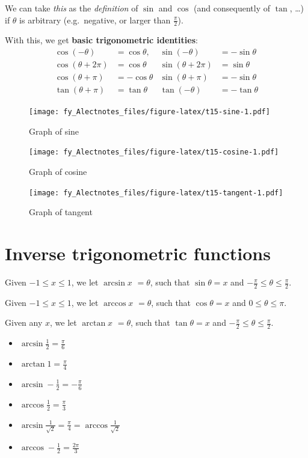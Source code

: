 \documentclass[
  12pt,
  oneside]{book}
\providecommand{\tightlist}{%
  \setlength{\itemsep}{0pt}\setlength{\parskip}{0pt}}
\theoremstyle{definition}
\theoremstyle{definition}
\theoremstyle{definition}
\theoremstyle{definition}
\theoremstyle{remark}
\begin{document}
We can take \emph{this} as the \emph{definition} of \(\sin\) and \(\cos\) (and consequently of \(\tan\), \ldots) if \(\theta\) is arbitrary (e.g.~negative, or larger than \(\frac\pi2\)).

With this, we get \textbf{basic trigonometric identities}:
\begin{align*}
    \cos(-\theta) &=\cos\theta, & \sin(-\theta) &=-\sin\theta \\
    \cos(\theta+2\pi) &=\cos\theta & \sin(\theta+2\pi) &=\sin\theta\\
    \cos(\theta+\pi) &= -\cos\theta & \sin(\theta+\pi) &= -\sin\theta\\
    \tan(\theta+\pi) &= \tan\theta & \tan(-\theta) &= -\tan\theta
\end{align*}

\begin{figure}
\centering
\texttt{[image: fy\_Alectnotes\_files/figure-latex/t15-sine-1.pdf]}
\caption{\label{fig:t15-sine}Graph of sine}
\end{figure}

\begin{figure}
\centering
\texttt{[image: fy\_Alectnotes\_files/figure-latex/t15-cosine-1.pdf]}
\caption{\label{fig:t15-cosine}Graph of cosine}
\end{figure}

\begin{figure}
\centering
\texttt{[image: fy\_Alectnotes\_files/figure-latex/t15-tangent-1.pdf]}
\caption{\label{fig:t15-tangent}Graph of tangent}
\end{figure}

\section{Inverse trigonometric functions}\label{inverse-trigonometric-functions}

Given \(-1\leq x\leq 1\), we let \(\arcsin x\) \(= \theta\), such that \(\sin\theta = x\) and \(-\frac\pi2\leq\theta\leq \frac\pi2\).

Given \(-1\leq x\leq 1\), we let \(\arccos x\) \(= \theta\), such that \(\cos\theta = x\) and \(0\leq\theta\leq \pi\).

Given any \(x\), we let \(\arctan x\) \(= \theta\), such that \(\tan\theta=x\) and \(-\frac\pi2\leq\theta\leq\frac\pi2\).

\begin{itemize}
\tightlist
\item
  \(\arcsin\frac12=\frac{\pi}6\)
\item
  \(\arctan 1 = \frac{\pi}{4}\)
\item
  \(\arcsin -\frac12=-\frac{\pi}6\)
\item
  \(\arccos\frac12 = \frac{\pi}3\)
\item
  \(\arcsin\frac{1}{\sqrt{2}} = \frac{\pi}{4} = \arccos\frac{1}{\sqrt{2}}\)
\item
  \(\arccos -\frac12= \frac{2\pi}{3}\)
\end{itemize}
\end{document}
